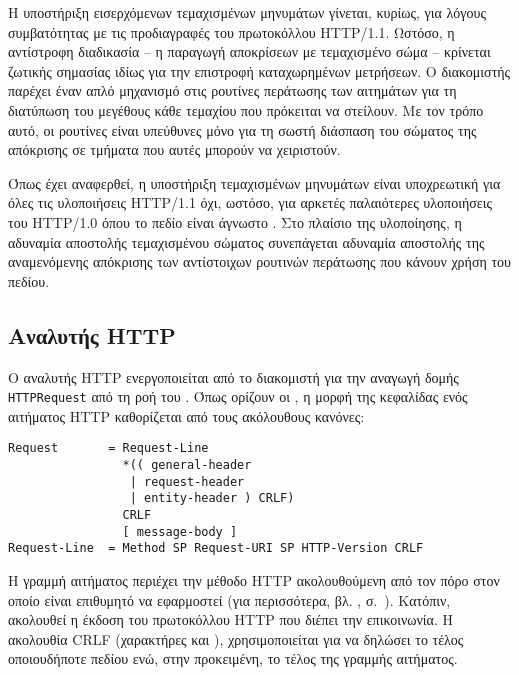 Η υποστήριξη εισερχόμενων τεμαχισμένων μηνυμάτων γίνεται, κυρίως, για λόγους
συμβατότητας με τις προδιαγραφές του πρωτοκόλλου HTTP/1.1. Ωστόσο, η αντίστροφη
διαδικασία -- η παραγωγή αποκρίσεων με τεμαχισμένο σώμα -- κρίνεται ζωτικής
σημασίας ιδίως για την επιστροφή καταχωρημένων μετρήσεων.
Ο διακομιστής παρέχει έναν απλό μηχανισμό στις ρουτίνες περάτωσης των αιτημάτων
για τη διατύπωση του μεγέθους κάθε τεμαχίου που πρόκειται να στείλουν. Με τον
τρόπο αυτό, οι ρουτίνες είναι υπεύθυνες μόνο για τη σωστή διάσπαση του σώματος
της απόκρισης σε τμήματα που αυτές μπορούν να χειριστούν.

Όπως έχει αναφερθεί, η υποστήριξη τεμαχισμένων μηνυμάτων είναι υποχρεωτική για
όλες τις υλοποιήσεις HTTP/1.1 όχι, ωστόσο, για αρκετές παλαιότερες υλοποιήσεις
του HTTP/1.0 όπου το πεδίο  είναι άγνωστο
\parencite[25--26,144]{rfc2616}. Στο πλαίσιο της υλοποίησης, η αδυναμία
αποστολής τεμαχισμένου σώματος συνεπάγεται αδυναμία αποστολής της αναμενόμενης
απόκρισης των αντίστοιχων ρουτινών περάτωσης που κάνουν χρήση του πεδίου.


\subsection{Αναλυτής HTTP}
\label{subsec:network:http-parser}

Ο αναλυτής HTTP ενεργοποιείται από το διακομιστή για την αναγωγή δομής
\verb~HTTPRequest~ από τη ροή του . Όπως ορίζουν οι
\textcite[35]{rfc2616}, η μορφή της κεφαλίδας ενός αιτήματος HTTP καθορίζεται
από τους ακόλουθους κανόνες:
\begin{lstlisting}
Request       = Request-Line
                *(( general-header
                 | request-header
                 | entity-header ) CRLF)
                CRLF
                [ message-body ]
Request-Line  = Method SP Request-URI SP HTTP-Version CRLF
\end{lstlisting}

Η γραμμή αιτήματος περιέχει την μέθοδο HTTP ακολουθούμενη από τον πόρο στον
οποίο είναι επιθυμητό να εφαρμοστεί (για περισσότερα,
βλ. ,
σ.~\pageref{ssubsec:network:resource-general}). Κατόπιν, ακολουθεί η έκδοση του
πρωτοκόλλου HTTP που διέπει την επικοινωνία. Η ακολουθία CRLF (χαρακτήρες
 και ), χρησιμοποιείται για να δηλώσει το
τέλος οποιουδήποτε πεδίου ενώ, στην προκειμένη, το τέλος της γραμμής αιτήματος.

